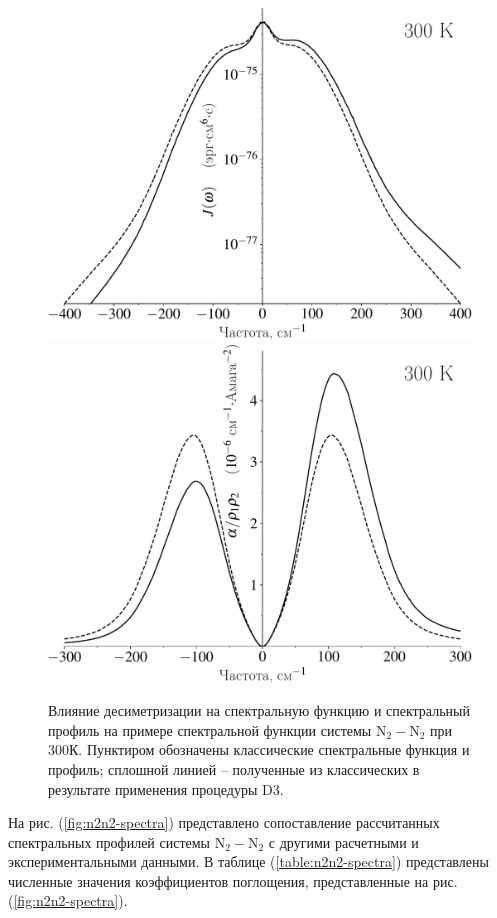\begin{figure}[H]
    \centering
    \includegraphics[width=0.49\linewidth]{./pictures/polyatom_spectra/n2n2_spectral_function_300K-crop.pdf}
    \includegraphics[width=0.49\linewidth]{./pictures/polyatom_spectra/n2n2_desymmetrization-crop.pdf}
    \caption{Влияние десиметризации на спектральную функцию и спектральный профиль на примере спектральной функции системы N$_2-$N$_2$ при 300К. Пунктиром обозначены классические спектральные функция и профиль; сплошной линией -- полученные из классических в результате применения процедуры D3.}
    \label{fig:n2n2-desymmetrization}
\end{figure}

На рис. (\ref{fig:n2n2-spectra}) представлено сопоставление рассчитанных спектральных профилей системы N$_2-$N$_2$ с другими расчетными и экспериментальными данными. В таблице (\ref{table:n2n2-spectra}) представлены численные значения коэффициентов поглощения, представленные на рис. (\ref{fig:n2n2-spectra}). 

